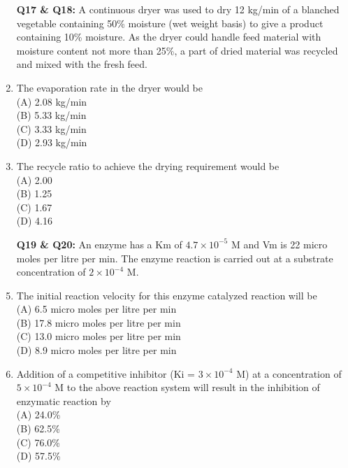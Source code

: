 \documentclass[journal,12pt,onecolumn]{IEEEtran}
\begin{document}
\begin{enumerate}
\item[\textbf{Q17 \& Q18:}] A continuous dryer was used to dry 12 kg/min of a blanched vegetable containing 50\% moisture (wet weight basis) to give a product containing 10\% moisture. As the dryer could handle feed material with moisture content not more than 25\%, a part of dried material was recycled and mixed with the fresh feed.
\vspace{0.2cm} \\

 \item The evaporation rate in the dryer would be
\vspace{0.2cm}
\hfill{} \\
(A) 2.08 kg/min \\
(B) 5.33 kg/min \\
(C) 3.33 kg/min \\
(D) 2.93 kg/min
\vspace{0.5cm}

\newpage
\item The recycle ratio to achieve the drying requirement would be
\vspace{0.2cm}
\hfill{} \\
(A) 2.00 \\
(B) 1.25 \\
(C) 1.67 \\
(D) 4.16
\vspace{0.5cm}


\item[\textbf{Q19 \& Q20:}] An enzyme has a Km of \(4.7 \times 10^{-5}\) M and Vm is 22 micro moles per litre per min. The enzyme reaction is carried out at a substrate concentration of \(2 \times 10^{-4}\) M.
\vspace{0.2cm} \\

\item The initial reaction velocity for this enzyme catalyzed reaction will be
\vspace{0.2cm}
\hfill{} \\
(A) 6.5 micro moles per litre per min \\
(B) 17.8 micro moles per litre per min \\
(C) 13.0 micro moles per litre per min \\
(D) 8.9 micro moles per litre per min
\vspace{0.5cm}

\item Addition of a competitive inhibitor (Ki = $3 \times 10^{-4}$ M) at a concentration of $5 \times 10^{-4}$ M to the above reaction system will result in the inhibition of enzymatic reaction by
\vspace{0.2cm}
\hfill{} \\
(A) 24.0\% \\
(B) 62.5\% \\
(C) 76.0\% \\
(D) 57.5\%
\vspace{0.5cm}


\end{enumerate}
\end{document}
